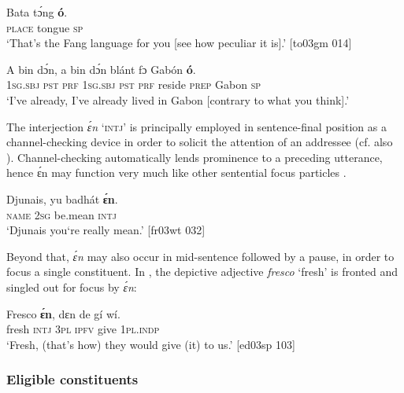 \ea%
    \label{ex:key:669}
    \gll Bata    tɔ́ng    \textbf{ó}.\\
\textsc{place}  tongue  \textsc{sp}\\

\glt ‘That’s the Fang language for you [see how peculiar it is].’ [to03gm 014]
\z


\ea%
    \label{ex:key:670}
    \gll \MakeUppercase{A}   bin  dɔ́n,    a    bin  dɔ́n    blánt  fɔ  Gabón  \textbf{ó}.\\
\textsc{1sg.sbj}  \textsc{pst}  \textsc{prf}    \textsc{1sg.sbj}  \textsc{pst}  \textsc{prf}    reside  \textsc{prep}  Gabon  \textsc{sp}\\

\glt ‘I’ve already, I’ve already lived in Gabon [contrary to what you think].’ 


\glt [ma03hm 035]
\z

The interjection \textit{ɛ́n} ‘\textsc{intj}’ is principally employed in sentence-final position as a channel-checking device in order to solicit the attention of an addressee (cf. also ). Channel-checking automatically lends prominence to a preceding utterance, hence ɛ́n may function very much like other sentential focus particles . 


\ea%
    \label{ex:key:671}
    \gll Djunais,  yu  badhát  \textbf{ɛ́n}.\\
\textsc{name}  \textsc{2sg}  be.mean  \textsc{intj}\\

\glt ‘Djunais you‘re really mean.’ [fr03wt 032]
\z

Beyond that, \textit{ɛ́n} may also occur in mid-sentence followed by a pause, in order to focus a single constituent. In , the  depictive adjective \textit{fresco} ‘fresh’ is fronted and singled out for focus by \textit{ɛ́n}:


\ea%
    \label{ex:key:672}
    \gll Fresco  \textbf{ɛ́n},  dɛn  de  gí  wí.\\
fresh  \textsc{intj}  \textsc{3pl}  \textsc{ipfv}  give  \textsc{1pl.indp}\\

\glt ‘Fresh, (that’s how) they would give (it) to us.’ [ed03sp 103] 
\z

\subsubsection{Eligible constituents}

